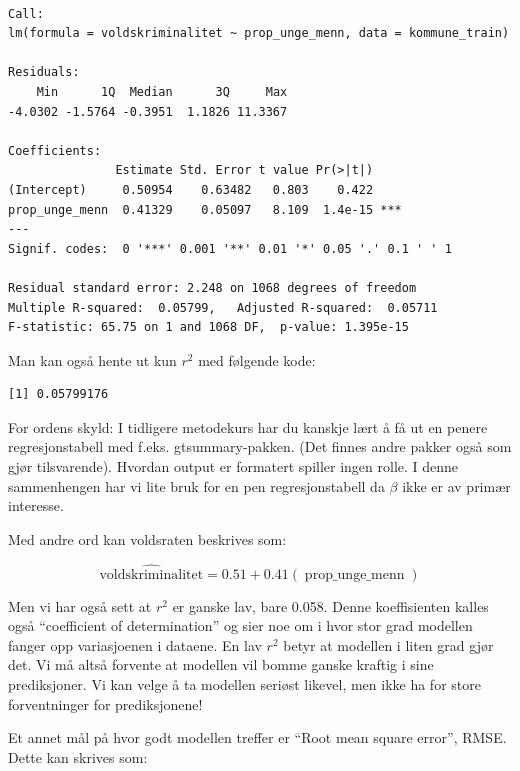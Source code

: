 \documentclass[
  letterpaper,
  DIV=11,
  numbers=noendperiod]{scrreprt}
\newenvironment{Shaded}{\begin{snugshade}}{\end{snugshade}}
\newcommand{\FunctionTok}[1]{\textcolor[rgb]{0.28,0.35,0.67}{#1}}
\newcommand{\NormalTok}[1]{\textcolor[rgb]{0.00,0.23,0.31}{#1}}
\newcommand{\SpecialCharTok}[1]{\textcolor[rgb]{0.37,0.37,0.37}{#1}}
\begin{document}
\begin{verbatim}

Call:
lm(formula = voldskriminalitet ~ prop_unge_menn, data = kommune_train)

Residuals:
    Min      1Q  Median      3Q     Max 
-4.0302 -1.5764 -0.3951  1.1826 11.3367 

Coefficients:
               Estimate Std. Error t value Pr(>|t|)    
(Intercept)     0.50954    0.63482   0.803    0.422    
prop_unge_menn  0.41329    0.05097   8.109  1.4e-15 ***
---
Signif. codes:  0 '***' 0.001 '**' 0.01 '*' 0.05 '.' 0.1 ' ' 1

Residual standard error: 2.248 on 1068 degrees of freedom
Multiple R-squared:  0.05799,   Adjusted R-squared:  0.05711 
F-statistic: 65.75 on 1 and 1068 DF,  p-value: 1.395e-15
\end{verbatim}

Man kan også hente ut kun \(r^2\) med følgende kode:

\begin{Shaded}
\end{Shaded}

\begin{verbatim}
[1] 0.05799176
\end{verbatim}

For ordens skyld: I tidligere metodekurs har du kanskje lært å få ut en
penere regresjonstabell med f.eks. gtsummary-pakken. (Det finnes andre
pakker også som gjør tilsvarende). Hvordan output er formatert spiller
ingen rolle. I denne sammenhengen har vi lite bruk for en pen
regresjonstabell da \(\beta\) ikke er av primær interesse.

Med andre ord kan voldsraten beskrives som:

\[
\operatorname{\widehat{voldskriminalitet}} = 0.51 + 0.41(\operatorname{prop\_unge\_menn})
\]

Men vi har også sett at \(r^2\) er ganske lav, bare 0.058. Denne
koeffisienten kalles også ``coefficient of determination'' og sier noe
om i hvor stor grad modellen fanger opp variasjoenen i dataene. En lav
\(r^2\) betyr at modellen i liten grad gjør det. Vi må altså forvente at
modellen vil bomme ganske kraftig i sine prediksjoner. Vi kan velge å ta
modellen seriøst likevel, men ikke ha for store forventninger for
prediksjonene!

Et annet mål på hvor godt modellen treffer er ``Root mean square
error'', RMSE. Dette kan skrives som:
\end{document}
